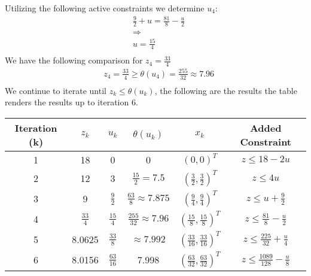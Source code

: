\documentclass[12pt]{article}
\begin{document}
    Utilizing the following active constraints we determine $u_4$:\\
        \begin{align*}
            &\frac{9}{2} + u = \frac{81}{8} - \frac{u}{2}\\
            &\Rightarrow\\
            &u = \frac{15}{4}\\
        \end{align*}
    We have the following comparison for $z_4 = \frac{33}{4}$\\
        \begin{align*}
            &z_4 = \frac{33}{4} \geq \theta (u_4) = \frac{255}{32} \approx 7.96\\
        \end{align*}
    We continue to iterate until $z_k \leq \theta(u_k)$, the following are the results the table renders the results up to iteration 6.\\
        \begin{table}[]
            \begin{tabular}{@{}cccccc@{}}
            \toprule
            Iteration  (k) & $z_k$          & $u_k$           & $\theta(u_k)$                 & $x_k$                              & Added Constraint                      \\ \midrule
            1              & 18           & 0             & 0                           & $(0,0)^T$                          & $z \leq 18-2u$       \\
            2              & 12           & 3             & $\frac{15}{2} = 7.5 $      & $(\frac{3}{2}, \frac{3}{2})^T$     & $z \leq 4u$        \\
            3              & 9            & $\frac{9}{2}$   & $\frac{63}{8} \approx 7.875$  & $(\frac{9}{4}, \frac{9}{4})^T$     & $z \leq u + \frac{9}{2}$   \\
            4              & $\frac{33}{4}$ & $\frac{15}{4}$  & $\frac{255}{32} \approx 7.96$ & $(\frac{15}{8}, \frac{15}{8})^T$   & $z \leq \frac{81}{8} - \frac{u}{2}$ \\
            5              & 8.0625       & $\frac{33}{8}$  & $\approx 7.992$              & $(\frac{33}{16}, \frac{33}{16})^T$ & $z \leq \frac{225}{32} + \frac{u}{4}$   \\
            6              & 8.0156       & $\frac{63}{16}$ & 7.998                       & $(\frac{63}{32}, \frac{63}{32})^T$ & $z \leq \frac{1089}{128} - \frac{u}{8}$ \\ \bottomrule
            \end{tabular}
        \end{table}\\        
\end{document}
